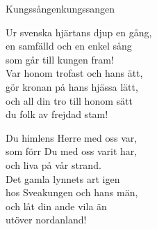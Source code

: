 \begin{song}{Kungssången}{kungssangen}
\begin{vers}
Ur svenska hjärtans djup en gång,\\
en samfälld och en enkel sång\\
som går till kungen fram!   \\
Var honom trofast och hans ätt,\\
gör kronan på hans hjässa lätt,\\
och all din tro till honom sätt\\
du folk av frejdad stam!\\
\end{vers}
\begin{vers}
Du himlens Herre med oss var,\\
som förr Du med oss varit har,\\
och liva på vår strand.\\
Det gamla lynnets art igen\\
hos Sveakungen och hans män,\\
och låt din ande vila än\\
utöver nordanland!\\
\end{vers}
\end{song}
